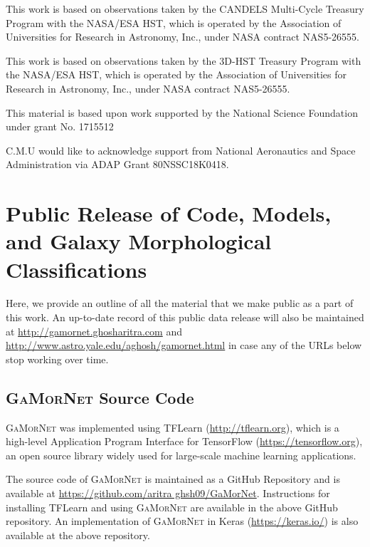 \documentclass[twocolumn]{aastex63}
\newcommand\gamornet{G\textsc{a}M\textsc{or}N\textsc{et}}
\begin{document}
This work is based on observations taken by the CANDELS Multi-Cycle Treasury Program with the NASA/ESA HST, which is operated by the Association of Universities for Research in Astronomy, Inc., under NASA contract NAS5-26555.

This work is based on observations taken by the 3D-HST Treasury Program with the NASA/ESA HST, which is operated by the Association of Universities for Research in Astronomy, Inc., under NASA contract NAS5-26555.

This material is based upon work supported by the National Science Foundation under grant No. 1715512

C.M.U would like to acknowledge support from National Aeronautics and Space Administration via ADAP Grant 80NSSC18K0418. 

\clearpage

\appendix

\section{Public Release of Code, Models, and Galaxy Morphological Classifications}\label{sec:ap:public_data_release}

Here, we provide an outline of all the material that we make public as a part of this work. An up-to-date record of this public data release will also be maintained at \href{http://gamornet.ghosharitra.com}{http://gamornet.ghosharitra.com} and \href{http://www.astro.yale.edu/aghosh/gamornet.html}{http://www.astro.yale.edu/aghosh/gamornet.html} in case any of the URLs below stop working over time.   

\subsection{\gamornet{} Source Code}\label{sec:ap:gamornet_source_code}

\gamornet{} was implemented using TFLearn\,\,(\href{http://tflearn.org}{http://tflearn.org}), which is a high-level Application Program Interface for TensorFlow\,\,(\href{https://tensorflow.org}{https://tensorflow.org}), an open source library widely used for large-scale machine learning applications.

The source code of \gamornet{} is maintained as a GitHub Repository and is available at \href{https://github.com/aritraghsh09/GaMorNet}{https://github.com/aritra ghsh09/GaMorNet}. Instructions for installing TFLearn and using \gamornet{} are available in the above GitHub repository. An implementation of \gamornet{} in Keras (\href{https://keras.io/}{https://keras.io/}) is also available at the above repository. 
\end{document}
